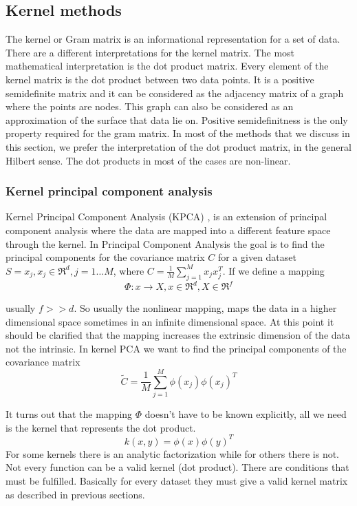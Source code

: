 \documentclass[12pt,letterpaper,doublespaced,ETD,dvips,proposal]{gtthesis}
\begin{document}
\begin{Body}
\subsection{Kernel methods}
\label{Kernel_methods}

The kernel or Gram matrix is an informational representation
for a set of data. There are a different interpretations for the
kernel matrix. The most mathematical interpretation is the dot
product matrix. Every element of the kernel matrix is the dot
product between two data points. It is a positive semidefinite
matrix and it can be considered as the adjacency matrix of a graph
where the points are nodes. This graph can also be considered as an
approximation of the surface that data lie on. Positive
semidefinitness is the only property required for the gram matrix.
In most of the methods that we discuss in this section, we prefer
the interpretation of the dot product matrix, in the general Hilbert
sense. The dot products in most of the cases are non-linear.

\subsubsection{Kernel principal component analysis}
\label{Kernel_principal_component_analysis}

Kernel Principal Component Analysis (KPCA) \cite{scholkopf2002lks}, is an extension of
principal component analysis where the data are mapped into a
different feature space through the kernel. In Principal Component
Analysis the goal is to find the principal components for  the
covariance matrix $C$ for a given dataset $S={x_j, x_j\in \Re^d, j=1
\dots M}$, where $C=\frac{1}{M}\sum_{j=1}^{M}x_j x_j^T$. If we
define a mapping
\begin{equation}
\Phi : x \rightarrow X , x \in \Re^d, X\in \Re^f
\end{equation}

usually $f>>d$. So usually the nonlinear mapping, maps the data in a
higher dimensional space sometimes in an infinite dimensional space.
At this point it should be clarified that the mapping increases the
extrinsic dimension of the data not the intrinsic. In kernel PCA we
want to find the principal components of the covariance matrix
\begin{equation}
\tilde{C} = \frac{1}{M}\sum_{j=1}^{M}\phi(x_j)\phi(x_j)^T
\end{equation}

It turns out that the mapping $\Phi$ doesn't have to be known
explicitly, all we need is the kernel that represents the dot
product.
\begin{equation}
k(x, y) = \phi(x)\phi(y)^T
\end{equation}
For some kernels there is an analytic factorization while for others
there is not. Not every function can be a valid kernel (dot
product). There are conditions that must be fulfilled. Basically for
every dataset they  must give a valid kernel matrix as described in
previous sections.


\end{Body}
\end{document}

